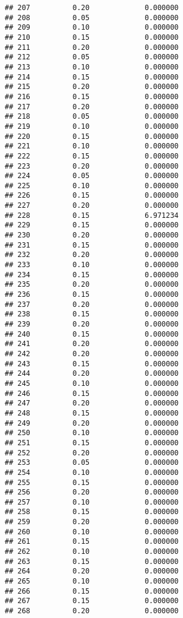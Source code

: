 \documentclass[
]{article}
\begin{document}
\begin{verbatim}
## 207          0.20             0.000000
## 208          0.05             0.000000
## 209          0.10             0.000000
## 210          0.15             0.000000
## 211          0.20             0.000000
## 212          0.05             0.000000
## 213          0.10             0.000000
## 214          0.15             0.000000
## 215          0.20             0.000000
## 216          0.15             0.000000
## 217          0.20             0.000000
## 218          0.05             0.000000
## 219          0.10             0.000000
## 220          0.15             0.000000
## 221          0.10             0.000000
## 222          0.15             0.000000
## 223          0.20             0.000000
## 224          0.05             0.000000
## 225          0.10             0.000000
## 226          0.15             0.000000
## 227          0.20             0.000000
## 228          0.15             6.971234
## 229          0.15             0.000000
## 230          0.20             0.000000
## 231          0.15             0.000000
## 232          0.20             0.000000
## 233          0.10             0.000000
## 234          0.15             0.000000
## 235          0.20             0.000000
## 236          0.15             0.000000
## 237          0.20             0.000000
## 238          0.15             0.000000
## 239          0.20             0.000000
## 240          0.15             0.000000
## 241          0.20             0.000000
## 242          0.20             0.000000
## 243          0.15             0.000000
## 244          0.20             0.000000
## 245          0.10             0.000000
## 246          0.15             0.000000
## 247          0.20             0.000000
## 248          0.15             0.000000
## 249          0.20             0.000000
## 250          0.10             0.000000
## 251          0.15             0.000000
## 252          0.20             0.000000
## 253          0.05             0.000000
## 254          0.10             0.000000
## 255          0.15             0.000000
## 256          0.20             0.000000
## 257          0.10             0.000000
## 258          0.15             0.000000
## 259          0.20             0.000000
## 260          0.10             0.000000
## 261          0.15             0.000000
## 262          0.10             0.000000
## 263          0.15             0.000000
## 264          0.20             0.000000
## 265          0.10             0.000000
## 266          0.15             0.000000
## 267          0.15             0.000000
## 268          0.20             0.000000

\end{verbatim}
\end{document}
